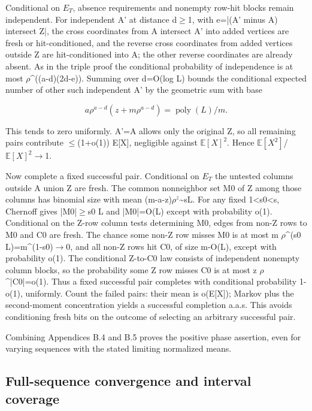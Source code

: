 \documentclass[11pt]{article}
\begin{document}
Conditional on $E_T$, absence requirements and nonempty row-hit blocks remain independent. For independent A' at distance d\ensuremath{\geq}1, with e=|(A' minus A) intersect Z|, the cross coordinates from A intersect A' into added vertices are fresh or hit-conditioned, and the reverse cross coordinates from added vertices outside Z are hit-conditioned into A; the other reverse coordinates are already absent. As in the triple proof the conditional probability of independence is at most $\rho$\textasciicircum{}((a-d)(2d-e)). Summing over d=O(log L) bounds the conditional expected number of other such independent A' by the geometric sum with base

\[
a\rho^{a-d}(z+m\rho^{a-d})=\operatorname{poly}(L)/m.
\]

This tends to zero uniformly. A'=A allows only the original Z, so all remaining pairs contribute \ensuremath{\leq}(1+o(1)) E[X], negligible against $\mathbb E[X]^2$. Hence $\mathbb E[X^2]$/$\mathbb E[X]^2$\ensuremath{\to}1.

Now complete a fixed successful pair. Conditional on $E_T$ the untested columns outside A union Z are fresh. The common nonneighbor set M0 of Z among those columns has binomial size with mean (m-a-z)$\rho^{z}$\textasciitilde{}sL. For any fixed 1<s0<s, Chernoff gives |M0|\ensuremath{\geq}s0 L and |M0|=O(L) except with probability o(1). Conditional on the Z-row column tests determining M0, edges from non-Z rows to M0 and C0 are fresh. The chance some non-Z row misses M0 is at most m $\rho$\textasciicircum{}(s0 L)=m\textasciicircum{}(1-s0)\ensuremath{\to}0, and all non-Z rows hit C0, of size m-O(L), except with probability o(1). The conditional Z-to-C0 law consists of independent nonempty column blocks, so the probability some Z row misses C0 is at most z $\rho$\textasciicircum{}|C0|=o(1). Thus a fixed successful pair completes with conditional probability 1-o(1), uniformly. Count the failed pairs: their mean is o(E[X]); Markov plus the second-moment concentration yields a successful completion a.a.s. This avoids conditioning fresh bits on the outcome of selecting an arbitrary successful pair.

Combining Appendices B.4 and B.5 proves the positive phase assertion, even for varying sequences with the stated limiting normalized means.

\subsection{Full-sequence convergence and interval coverage}
\end{document}
